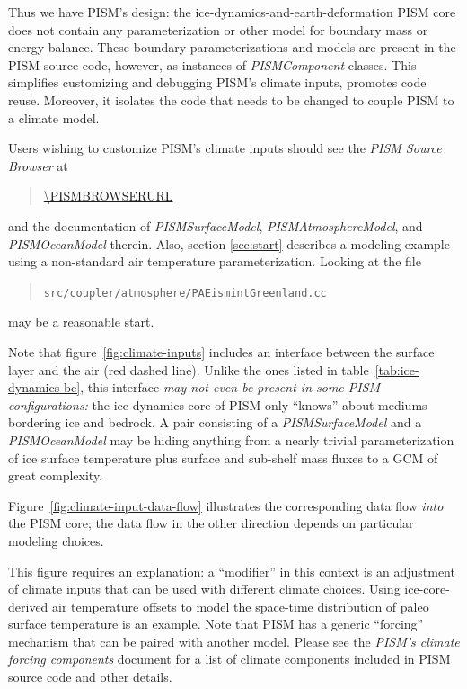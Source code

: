 Thus we have PISM's design: the ice-dynamics-and-earth-deformation PISM
core does not contain any parameterization or other model for boundary mass or
energy balance.  These boundary parameterizations and models are present in the PISM source code, however, as instances of \emph{PISMComponent} classes.  This simplifies customizing and debugging PISM's climate
inputs, promotes code reuse.  Moreover, it isolates the code that needs to be changed to
couple PISM to a climate model.

Users wishing to customize PISM's climate inputs should see the \emph{PISM
  Source Browser} at
\begin{quote}
  \url{\PISMBROWSERURL}
\end{quote}
 and the documentation
of \mbox{\emph{PISMSurfaceModel}}, \mbox{\emph{PISMAtmosphereModel}}, and
\mbox{\emph{PISMOceanModel}} therein.  Also, section \ref{sec:start} describes a
modeling example using a non-standard air temperature parameterization. Looking
at the file
\begin{quote}
\texttt{src/coupler/atmosphere/PAEismintGreenland.cc}
\end{quote}
may be a reasonable start.

Note that figure~\ref{fig:climate-inputs} includes an interface between the surface layer and the air (red dashed line).
Unlike the ones listed in table~\ref{tab:ice-dynamics-bc}, this interface
\emph{may not even be present in some PISM configurations:} the ice dynamics
core of PISM only ``knows'' about mediums bordering ice and bedrock. A pair
consisting of a \emph{PISMSurfaceModel} and a \emph{PISMOceanModel} may be
hiding anything from a nearly trivial parameterization of ice surface
temperature plus surface and sub-shelf mass fluxes to a GCM of great
complexity.

Figure~\ref{fig:climate-input-data-flow} illustrates the corresponding data
flow \emph{into} the PISM core; the data flow in the other direction depends on
particular modeling choices.

This figure requires an explanation: a ``modifier'' in this context is an
adjustment of climate inputs that can be used with different climate
choices.  Using ice-core-derived air temperature offsets to model the
space-time distribution of paleo surface temperature is an example.  Note that
PISM has a generic ``forcing'' mechanism that can be paired with another model.
Please see the \emph{PISM's climate forcing components} document for
a list of climate components included in PISM source code and other details.

